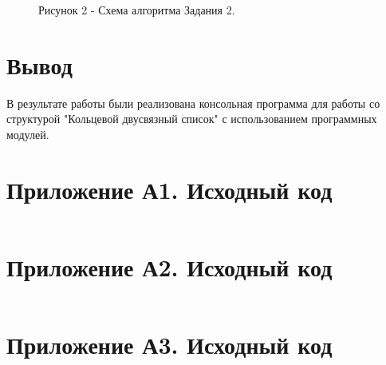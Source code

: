 \documentclass[oneside,a4paper,14pt]{extarticle}
\begin{document}
\begin{figure}[H]
	\centering
	\caption*{Рисунок 2 - Схема алгоритма Задания 2.}
\end{figure}

\section*{Вывод}


В результате работы были реализована консольная программа для работы со структурой "Кольцевой двусвязный список" с использованием программных модулей.

\newpage

\section*{Приложение А1. Исходный код}
\inputminted{cpp}{code/cdll.h}

\section*{Приложение А2. Исходный код}
\inputminted{cpp}{code/cdll.c}

\section*{Приложение А3. Исходный код}
\inputminted{cpp}{code/cli.c}
\end{document}
